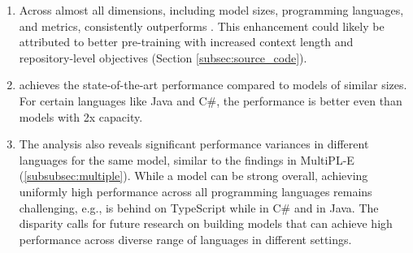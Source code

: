 \documentclass[10pt]{article} %
\begin{document}
\begin{enumerate}
    \item Across almost all dimensions, including model sizes, programming languages, and metrics, \starcodertwo{} consistently outperforms \starcoderbase{}. This enhancement could likely be attributed to better pre-training with increased context length and repository-level objectives (Section \ref{subsec:source_code}).
    \item {} achieves the state-of-the-art performance compared to models of similar sizes. For certain languages like Java and C\#, the performance is better even than models with 2x capacity.
    \item The analysis also reveals significant performance variances in different languages for the same model, similar to the findings in MultiPL-E (\cref{subsubsec:multiple}). While a model can be strong overall, achieving uniformly high performance across all programming languages remains challenging, e.g.,  is behind on TypeScript while  in C\# and  in Java. The disparity calls for future research on building models that can achieve high performance across diverse range of languages in different settings.
\end{enumerate}
\end{document}
